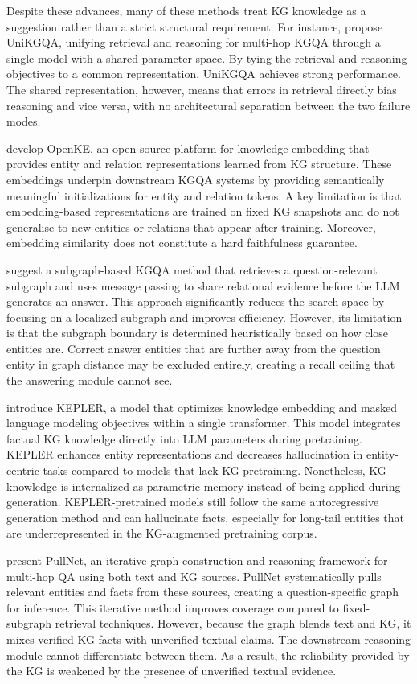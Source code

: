 Despite these advances, many of these methods treat KG knowledge as a suggestion rather than a strict structural requirement. For instance, \citet{jiang2022unikgqa} propose UniKGQA, unifying retrieval and reasoning for multi-hop KGQA through a single model with a shared parameter space. By tying the retrieval and reasoning objectives to a common representation, UniKGQA achieves strong performance. The shared representation, however, means that errors in retrieval directly bias reasoning and vice versa, with no architectural separation between the two failure modes.

\citet{sun2018openke} develop OpenKE, an open-source platform for knowledge embedding that provides entity and relation representations learned from KG structure. These embeddings underpin downstream KGQA systems by providing semantically meaningful initializations for entity and relation tokens. A key limitation is that embedding-based representations are trained on fixed KG snapshots and do not generalise to new entities or relations that appear after training. Moreover, embedding similarity does not constitute a hard faithfulness guarantee.

\citet{zhang2022subgraph} suggest a subgraph-based KGQA method that retrieves a question-relevant subgraph and uses message passing to share relational evidence before the LLM generates an answer. This approach significantly reduces the search space by focusing on a localized subgraph and improves efficiency. However, its limitation is that the subgraph boundary is determined heuristically based on how close entities are. Correct answer entities that are further away from the question entity in graph distance may be excluded entirely, creating a recall ceiling that the answering module cannot see.

\citet{wang2021kepler} introduce KEPLER, a model that optimizes knowledge embedding and masked language modeling objectives within a single transformer. This model integrates factual KG knowledge directly into LLM parameters during pretraining. KEPLER enhances entity representations and decreases hallucination in entity-centric tasks compared to models that lack KG pretraining. Nonetheless, KG knowledge is internalized as parametric memory instead of being applied during generation. KEPLER-pretrained models still follow the same autoregressive generation method and can hallucinate facts, especially for long-tail entities that are underrepresented in the KG-augmented pretraining corpus.

\citet{sun2019pullnet} present PullNet, an iterative graph construction and reasoning framework for multi-hop QA using both text and KG sources. PullNet systematically pulls relevant entities and facts from these sources, creating a question-specific graph for inference. This iterative method improves coverage compared to fixed-subgraph retrieval techniques. However, because the graph blends text and KG, it mixes verified KG facts with unverified textual claims. The downstream reasoning module cannot differentiate between them. As a result, the reliability provided by the KG is weakened by the presence of unverified textual evidence.

